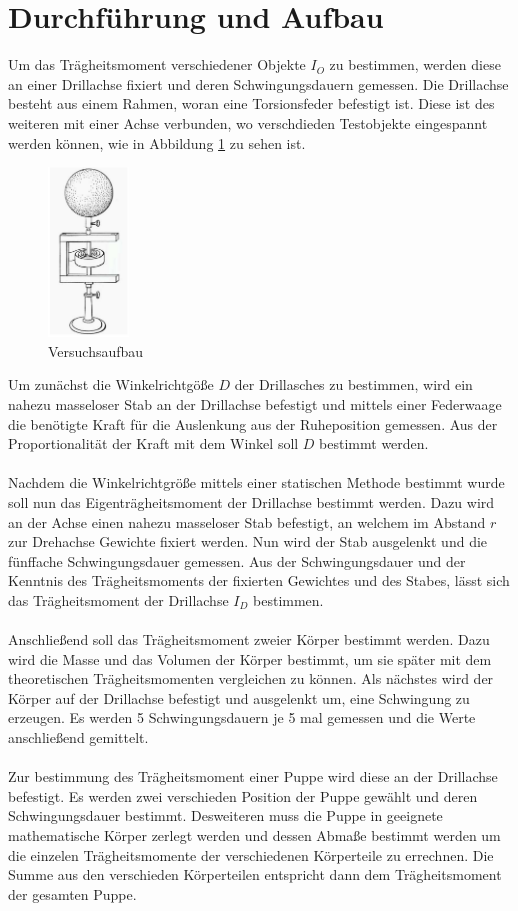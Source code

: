 \section{Durchführung und Aufbau}
\label{sec:Durchführung}
Um das Trägheitsmoment verschiedener Objekte $I_O$ zu bestimmen, werden diese an einer Drillachse fixiert und deren Schwingungsdauern gemessen. Die Drillachse besteht aus einem Rahmen, woran eine Torsionsfeder befestigt ist. Diese ist des weiteren mit einer Achse verbunden, wo verschdieden Testobjekte eingespannt werden können, wie in Abbildung \ref{fig:drillachse} zu sehen ist. 
\ \\
\begin{figure}[ht]
	\centering
	\includegraphics[height=4.5cm]{Abbildung1.png}
	\caption{Versuchsaufbau\cite{sample}}
	\label{fig:drillachse}
\end{figure}

Um zunächst die Winkelrichtgöße $D$ der Drillasches zu bestimmen, wird ein nahezu masseloser Stab an der Drillachse befestigt und mittels einer Federwaage die benötigte Kraft für die  Auslenkung aus der Ruheposition gemessen. Aus der Proportionalität der Kraft mit dem Winkel soll $D$ bestimmt werden. 
\\
\\
Nachdem die Winkelrichtgröße mittels einer statischen Methode bestimmt wurde soll nun das Eigenträgheitsmoment der Drillachse bestimmt werden. Dazu wird an der Achse einen nahezu masseloser Stab befestigt, an welchem im Abstand $r$ zur Drehachse Gewichte fixiert werden. Nun wird der Stab ausgelenkt und die fünffache Schwingungsdauer gemessen. Aus der Schwingungsdauer und der Kenntnis des Trägheitsmoments der fixierten Gewichtes und des Stabes, lässt sich das Trägheitsmoment der Drillachse $I_D$ bestimmen.
\\
\\
Anschließend soll das Trägheitsmoment zweier Körper bestimmt werden. Dazu wird die Masse und das Volumen der Körper bestimmt, um sie später mit dem theoretischen Trägheitsmomenten vergleichen zu können. Als nächstes wird der Körper auf der Drillachse befestigt und ausgelenkt um, eine Schwingung zu erzeugen. Es werden 5 Schwingungsdauern je 5 mal gemessen und die Werte anschließend gemittelt. 
\\
\\
Zur bestimmung des Trägheitsmoment einer Puppe wird diese an der Drillachse befestigt. Es werden zwei verschieden Position der Puppe gewählt und deren Schwingungsdauer bestimmt. Desweiteren muss die Puppe in geeignete mathematische Körper zerlegt werden und dessen Abmaße bestimmt werden um die einzelen Trägheitsmomente der verschiedenen Körperteile zu errechnen. Die Summe aus den verschieden Körperteilen entspricht dann dem Trägheitsmoment der gesamten Puppe.
